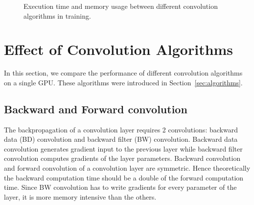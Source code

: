 \begin{figure}[!t]
  \centering
  \hfil
  \caption{Execution time and memory usage between different convolution algorithms in training.}
  \label{fig_conv_time}
\end{figure}%

\section{Effect of Convolution Algorithms}
\label{convolution-algorithms}
In this section, we compare the performance of different convolution algorithms on a single GPU. These algorithms were introduced in Section~\ref{sec:algorithms}. 

\subsection{Backward and Forward convolution}
The backpropagation of a convolution layer requires 2 convolutions: backward data (\textsf{BD}) convolution and backward filter (\textsf{BW}) convolution. Backward data convolution generates gradient input to the previous layer while backward filter convolution computes gradients of the layer parameters. Backward convolution and forward convolution of a convolution layer are symmetric. Hence theoretically the backward computation time should be a double of the forward computation time. Since \textsf{BW} convolution has to write gradients for every parameter of the layer, it is more memory intensive than the others. 

